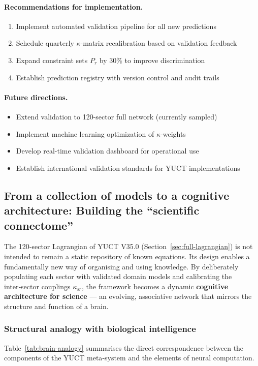 \documentclass[13pt,a4paper]{article}
\begin{document}
	\paragraph{Recommendations for implementation.}
	\begin{enumerate}[leftmargin=*]
		\item Implement automated validation pipeline for all new predictions
		\item Schedule quarterly $\kappa$-matrix recalibration based on validation feedback
		\item Expand constraint sets $P_r$ by 30\% to improve discrimination
		\item Establish prediction registry with version control and audit trails
	\end{enumerate}
	
	\paragraph{Future directions.}
	\begin{itemize}
		\item Extend validation to 120-sector full network (currently sampled)
		\item Implement machine learning optimization of $\kappa$-weights
		\item Develop real-time validation dashboard for operational use
		\item Establish international validation standards for YUCT implementations
	\end{itemize}
	
	\subsection{From a collection of models to a cognitive architecture:
		Building the ``scientific connectome''}
	\label{subsec:cognitive-architecture}
	
	The 120‑sector Lagrangian of YUCT V35.0 (Section~\ref{sec:full-lagrangian}) is
	not intended to remain a static repository of known equations. Its design enables
	a fundamentally new way of organising and using knowledge. By deliberately
	populating each sector with validated domain models and calibrating the
	inter‑sector couplings \(\kappa_{sr}\), the framework becomes a dynamic
	\textbf{cognitive architecture for science} — an evolving, associative network
	that mirrors the structure and function of a brain.
	
	\subsubsection*{Structural analogy with biological intelligence}
	Table~\ref{tab:brain-analogy} summarises the direct correspondence between the
	components of the YUCT meta‑system and the elements of neural computation.
	
\end{document}
